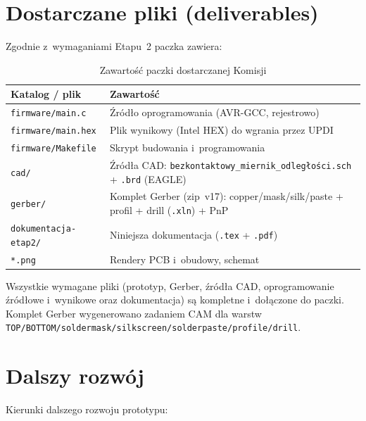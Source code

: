 \documentclass[a4paper,11pt]{article}
\begin{document}
\section{Dostarczane pliki (deliverables)}
\label{sec:deliverables}

Zgodnie z~wymaganiami Etapu~2 paczka zawiera:

\begin{table}[H]
	\centering
	\caption{Zawartość paczki dostarczanej Komisji}
	\label{tab:deliverables}
	\begin{tabularx}{\textwidth}{lX}
		\toprule
		\textbf{Katalog / plik} & \textbf{Zawartość} \\
		\midrule
		\texttt{firmware/main.c} & Źródło oprogramowania (AVR-GCC, rejestrowo) \\
		\texttt{firmware/main.hex} & Plik wynikowy (Intel HEX) do wgrania przez UPDI \\
		\texttt{firmware/Makefile} & Skrypt budowania i~programowania \\
		\texttt{cad/} & Źródła CAD: \texttt{bezkontaktowy\_miernik\_odległości.sch} + \texttt{.brd} (EAGLE) \\
		\texttt{gerber/} & Komplet Gerber (zip~v17): copper/mask/silk/paste + profil + drill (\texttt{.xln}) + PnP \\
		\texttt{dokumentacja-etap2/} & Niniejsza dokumentacja (\texttt{.tex} + \texttt{.pdf}) \\
		\texttt{*.png} & Rendery PCB i~obudowy, schemat \\
		\bottomrule
	\end{tabularx}
\end{table}

Wszystkie wymagane pliki (prototyp, Gerber, źródła CAD, oprogramowanie
źródłowe i~wynikowe oraz dokumentacja) są kompletne i~dołączone do paczki.
Komplet Gerber wygenerowano zadaniem CAM dla warstw
\texttt{TOP/BOTTOM/soldermask/silkscreen/solderpaste/profile/drill}.

\section{Dalszy rozwój}
\label{sec:dalsze}

Kierunki dalszego rozwoju prototypu:
\end{document}
